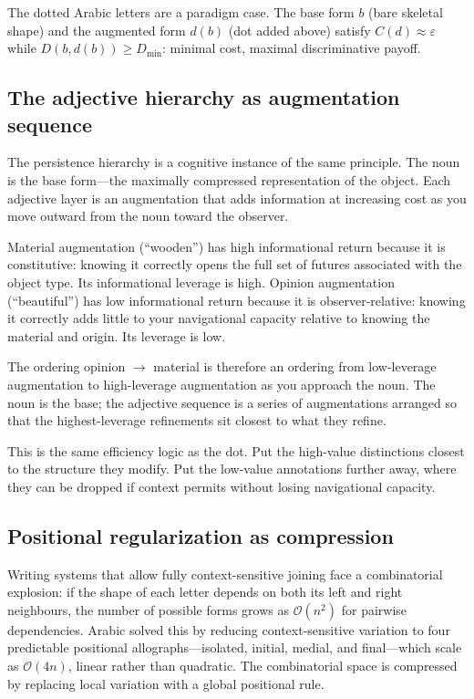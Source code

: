 \documentclass[11pt]{article}
\theoremstyle{rthm}
\theoremstyle{rdef}
\theoremstyle{remark}
\begin{document}
The dotted Arabic letters are a paradigm case. The base form $b$ (bare
skeletal shape) and the augmented form $d(b)$ (dot added above) satisfy
$C(d) \approx \varepsilon$ while $D(b, d(b)) \geq D_{\min}$: minimal cost,
maximal discriminative payoff.

\subsection{The adjective hierarchy as augmentation sequence}

The persistence hierarchy is a cognitive instance of the same principle.
The noun is the base form---the maximally compressed representation of the
object. Each adjective layer is an augmentation that adds information at
increasing cost as you move outward from the noun toward the observer.

Material augmentation (``wooden'') has high informational return because it
is constitutive: knowing it correctly opens the full set of futures associated
with the object type. Its informational leverage is high. Opinion augmentation
(``beautiful'') has low informational return because it is observer-relative:
knowing it correctly adds little to your navigational capacity relative to
knowing the material and origin. Its leverage is low.

The ordering opinion $\to$ material is therefore an ordering from
low-leverage augmentation to high-leverage augmentation as you approach the
noun. The noun is the base; the adjective sequence is a series of augmentations
arranged so that the highest-leverage refinements sit closest to what they
refine.

This is the same efficiency logic as the dot. Put the high-value distinctions
closest to the structure they modify. Put the low-value annotations further
away, where they can be dropped if context permits without losing navigational
capacity.

\subsection{Positional regularization as compression}

Writing systems that allow fully context-sensitive joining face a combinatorial
explosion: if the shape of each letter depends on both its left and right
neighbours, the number of possible forms grows as $\mathcal{O}(n^2)$ for
pairwise dependencies. Arabic solved this by reducing context-sensitive
variation to four predictable positional allographs---isolated, initial,
medial, and final---which scale as $\mathcal{O}(4n)$, linear rather than
quadratic. The combinatorial space is compressed by replacing local variation
with a global positional rule.
\end{document}

